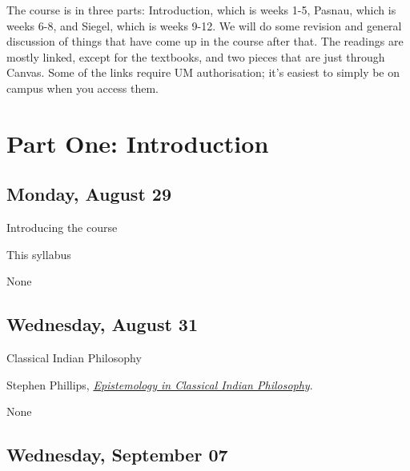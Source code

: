 \documentclass[
]{article}
\providecommand{\tightlist}{%
  \setlength{\itemsep}{0pt}\setlength{\parskip}{0pt}}\usepackage{longtable,booktabs,array}
\begin{document}
\newpage

The course is in three parts: Introduction, which is weeks 1-5, Pasnau,
which is weeks 6-8, and Siegel, which is weeks 9-12. We will do some
revision and general discussion of things that have come up in the
course after that. The readings are mostly linked, except for the
textbooks, and two pieces that are just through Canvas. Some of the
links require UM authorisation; it's easiest to simply be on campus when
you access them.

\hypertarget{part-one-introduction}{%
\section{Part One: Introduction}\label{part-one-introduction}}

\hypertarget{monday-august-29}{%
\subsection{Monday, August 29}\label{monday-august-29}}

\begin{description}
\tightlist
\item[Topic]
Introducing the course
\item[Required Reading]
This syllabus
\item[Suggested Reading]
None
\end{description}

\hypertarget{wednesday-august-31}{%
\subsection{Wednesday, August 31}\label{wednesday-august-31}}

\begin{description}
\tightlist
\item[Topic]
Classical Indian Philosophy
\item[Required Reading]
Stephen Phillips,
\href{https://plato.stanford.edu/entries/epistemology-india/}{\emph{Epistemology
in Classical Indian Philosophy}}.
\item[Suggested Reading]
None
\end{description}

\hypertarget{wednesday-september-07}{%
\subsection{Wednesday, September 07}\label{wednesday-september-07}}
\end{document}
